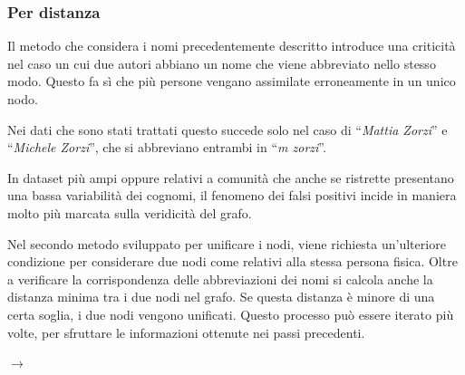 \documentclass[12pt,a4paper,twoside]{report}
\begin{document}
\subsubsection{Per distanza} \label{ssc:distanza}

Il metodo che considera i nomi precedentemente descritto introduce una criticità nel caso un cui due
autori abbiano un nome che viene abbreviato nello stesso modo.
Questo fa sì che più persone vengano assimilate erroneamente in un unico nodo.

Nei dati che sono stati trattati questo succede solo nel caso di ``\textit{Mattia Zorzi}'' e
``\textit{Michele Zorzi}'', che si abbreviano entrambi in ``\textit{m zorzi}''.

In dataset più ampi oppure relativi a comunità che anche se ristrette presentano una bassa
variabilità dei cognomi, il fenomeno dei falsi positivi incide in maniera molto più marcata sulla
veridicità del grafo.

Nel secondo metodo sviluppato per unificare i nodi, viene richiesta un'ulteriore condizione per
considerare due nodi come relativi alla stessa persona fisica. Oltre a verificare la corrispondenza
delle abbreviazioni dei nomi si calcola anche la distanza minima tra i due nodi nel grafo. Se questa
distanza è minore di una certa soglia, i due nodi vengono unificati. Questo processo può essere
iterato più volte, per sfruttare le informazioni ottenute nei passi precedenti.

\begin{center}
\begin{minipage}{0.40\textwidth}
\end{minipage}
\begin{minipage}{0.075\textwidth}
$\rightarrow$
\end{minipage}
\begin{minipage}{0.40\textwidth}
\end{minipage}
\end{center}
\end{document}

